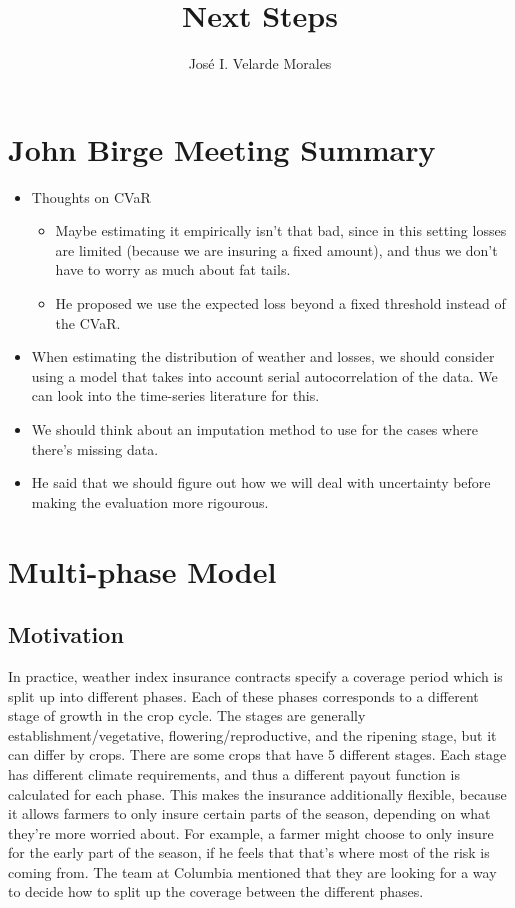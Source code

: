 \documentclass[11pt]{article}
\title{Next Steps}
\author{José I. Velarde Morales}
\begin{document}
\maketitle
\section{John Birge Meeting Summary}
    \begin{itemize}
        \item Thoughts on CVaR
        \begin{itemize}
            \item Maybe estimating it empirically isn't that bad, since in this setting losses are limited (because we are insuring a fixed amount), and thus we don't have to worry as much about fat tails. 
            \item He proposed we use the expected loss beyond a fixed threshold instead of the CVaR. 
        \end{itemize}
        \item When estimating the distribution of weather and losses, we should consider using a model that takes into account serial autocorrelation of the data. We can look into the time-series literature for this. 
        \item We should think about an imputation method to use for the cases where there's missing data. 
        \item He said that we should figure out how we will deal with uncertainty before making the evaluation more rigourous. 
    \end{itemize}

\section{Multi-phase Model}
\subsection{Motivation}
In practice, weather index insurance contracts specify a coverage period which is split up into different phases. Each of these phases corresponds to a different stage of growth in the crop cycle. The stages are generally establishment/vegetative, flowering/reproductive, and the ripening stage, but it can differ by crops. There are some crops that have 5 different stages. Each stage has different climate requirements, and thus a different payout function is calculated for each phase. This makes the insurance additionally flexible, because it allows farmers to only insure certain parts of the season, depending on what they're more worried about. For example, a farmer might choose to only insure for the early part of the season, if he feels that that's where most of the risk is coming from. The team at Columbia mentioned that they are looking for a way to decide how to split up the coverage between the different phases. 
\end{document}
